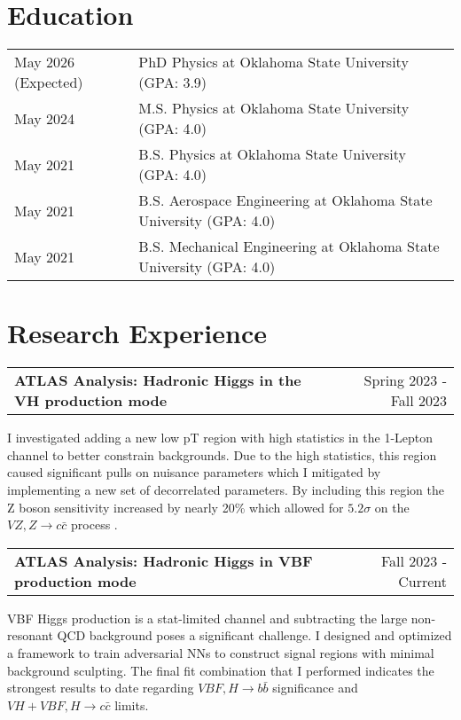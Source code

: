 \documentclass[a4paper,12pt]{article}
\makeatletter
\newenvironment{jobshort}[2]
    {
    \begin{tabularx}{\linewidth}{@{}l X r@{}}
    \textbf{#1} & \hfill &  #2 \\[3.75pt]
    \end{tabularx}
    }
    {
    }
\makeatother
\begin{document}
\section{Education}
\begin{tabularx}{\linewidth}{@{}l X@{}}	
May 2026 (Expected) & PhD Physics at Oklahoma State University \hfill \normalsize (GPA: 3.9) \\

May 2024 & M.S. Physics at Oklahoma State University \hfill (GPA: 4.0) \\ 

May 2021 & B.S. Physics at Oklahoma State University \hfill (GPA: 4.0) \\ 

May 2021 & B.S. Aerospace Engineering at Oklahoma State University \hfill (GPA: 4.0) \\ 

May 2021 & B.S. Mechanical Engineering at Oklahoma State University \hfill (GPA: 4.0) \\ 

\end{tabularx}

\section{Research Experience}

\begin{jobshort}{ATLAS Analysis: Hadronic Higgs in the VH production mode}{Spring 2023 - Fall 2023}
I investigated adding a new low pT region with high statistics in the 1-Lepton channel to better constrain backgrounds.
Due to the high statistics, this region caused significant pulls on nuisance parameters which I mitigated by implementing a new set of decorrelated parameters.
By including this region the Z boson sensitivity increased by nearly 20\% which allowed for $5.2\sigma$ on the $VZ, Z\rightarrow c\bar{c}$ process \cite{VH}.
\end{jobshort}

\begin{jobshort}{ATLAS Analysis: Hadronic Higgs in VBF production mode}{Fall 2023 - Current}
VBF Higgs production is a stat-limited channel and subtracting the large non-resonant QCD background poses a significant challenge.
I designed and optimized a framework to train adversarial NNs to construct signal regions with minimal background sculpting.
The final fit combination that I performed indicates the strongest results to date regarding $VBF,H \rightarrow b\bar{b}$ significance and $VH+VBF,H \rightarrow c\bar{c}$ limits\cite{VBF}.
\end{jobshort}
\end{document}
